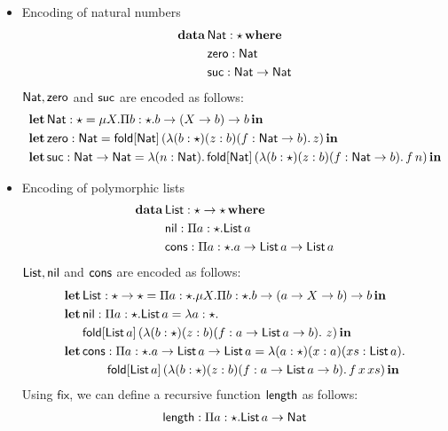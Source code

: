 \begin{itemize}
\item Encoding of natural numbers
  \begin{align*}
    \mathbf{data}\,&\mathsf{Nat} : \star\,\mathbf{where} \\
           &\mathsf{zero} : \mathsf{Nat} \\
           &\mathsf{suc} : \mathsf{Nat} \rightarrow \mathsf{Nat}
  \end{align*}
  $\mathsf{Nat},\mathsf{zero}$ and $\mathsf{suc}$ are encoded as follows:
  \begin{align*}
    \mathbf{let}\,&\mathsf{Nat} : \star = \mu X.\Pi b:\star.b \rightarrow (X \rightarrow b) \rightarrow b\,\mathbf{in} \\
    \mathbf{let}\,&\mathsf{zero} : \mathsf{Nat} = \mathsf{fold}[\mathsf{Nat}]\,(\lambda (b : \star) (z : b) (f : \mathsf{Nat} \rightarrow b).\,z)\,\mathbf{in} \\
    \mathbf{let}\,&\mathsf{suc} : \mathsf{Nat} \rightarrow \mathsf{Nat} = \lambda (n : \mathsf{Nat}).\,\mathsf{fold}[\mathsf{Nat}]\,(\lambda (b : \star) (z : b) (f : \mathsf{Nat} \rightarrow b).\,f\,n)\,\mathbf{in} \\
  \end{align*}
\item Encoding of polymorphic lists
  \begin{align*}
    \mathbf{data}\,&\mathsf{List} : \star \rightarrow \star\,\mathbf{where} \\
           &\mathsf{nil} : \Pi a:\star.\mathsf{List}\,a \\
           &\mathsf{cons} : \Pi a:\star.a \rightarrow \mathsf{List}\,a \rightarrow \mathsf{List}\,a
  \end{align*}
  $\mathsf{List},\mathsf{nil}$ and $\mathsf{cons}$ are encoded as follows:
  \begin{align*}
    \mathbf{let}\,&\mathsf{List} : \star \rightarrow \star = \Pi a:\star.\mu X.\Pi b:\star.b \rightarrow (a \rightarrow X \rightarrow b) \rightarrow b\,\mathbf{in} \\
    \mathbf{let}\,&\mathsf{nil} : \Pi a:\star.\mathsf{List}\,a = \lambda a : \star.\\
            &\mathsf{fold}[\mathsf{List}\,a]\,(\lambda (b : \star) (z : b) (f : a \rightarrow \mathsf{List}\,a \rightarrow b).\ z)\,\mathbf{in} \\
    \mathbf{let}\,&\mathsf{cons} : \Pi a:\star.a \rightarrow \mathsf{List}\,a \rightarrow \mathsf{List}\,a = \lambda(a:\star)(x : a)(xs : \mathsf{List}\,a).\\
            &\qquad \mathsf{fold}[\mathsf{List}\,a]\,(\lambda(b : \star)(z : b)(f : a \rightarrow \mathsf{List}\,a \rightarrow b).\,f\,x\,xs)\,\mathbf{in}
  \end{align*}
  Using $\mathsf{fix}$, we can define a recursive function $\mathsf{length}$
  as follows:
  \begin{align*}
    \length &: \pai{a}{\star}{\List\,a \rightarrow \Nat} \\

\end{align*}
\end{itemize}
